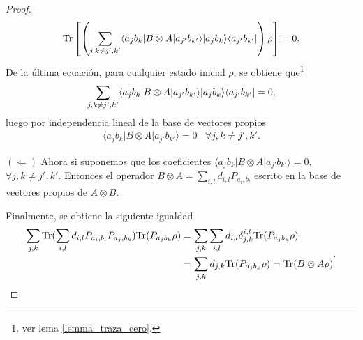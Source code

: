 \begin{proof}
\[\begin{split}
    {\rm Tr}\left[\left(\sum_{j,k\ne j',k'}  \langle a_j b_k |B\otimes A|a_{j'}b_{k'}\rangle |a_j b_k\rangle \langle a_{j'}b_{k'}|\right)\rho\right]&=0.\\
    \end{split}\]
    De la última ecuación, para cualquier estado inicial $\rho$, se obtiene que\footnote[1]{ver lema {\ref{lemma_traza_cero}}.} 
    \[\sum_{j,k\ne j', k'} \langle a_j b_k |B\otimes A|a_{j'}b_{k'}\rangle |a_j b_k\rangle \langle a_{j'}b_{k'}|=0,\] luego por independencia lineal de la base de vectores propios  
     \[\begin{array}{cc}
        \langle a_j b_k |B\otimes A|a_{j'}b_{k'}\rangle=0& \forall j,k\ne j',k'.\end{array}\]

        $(\Leftarrow)$
        Ahora si suponemos que los coeficientes  $\langle a_j b_k |B\otimes A|a_{j'}b_{k'}\rangle=0$,  $\forall j,k\ne j',k'$. Entonces el operador $B\otimes A=\sum_{i,l}d_{i,l}P_{a_i, b_l}$ escrito en la base de vectores propios de $A\otimes B$.
        
        Finalmente, se obtiene la siguiente igualdad \[\begin{split}\sum_{j,k}{\rm Tr}( \sum_{i,l}d_{i,l}P_{a_i, b_l} P_{a_j,b_k}){\rm Tr}(P_{a_j b_k}\rho )&=\sum_{j,k}\sum_{i,l}d_{i,l}\delta_{j,k}^{i,l}{\rm Tr}(P_{a_j b_k}\rho )\\&=\sum_{j,k}d_{j,k}{\rm Tr}(P_{a_j b_k}\rho )={\rm Tr}(B\otimes A\rho)\end{split}.\]


\end{proof}



